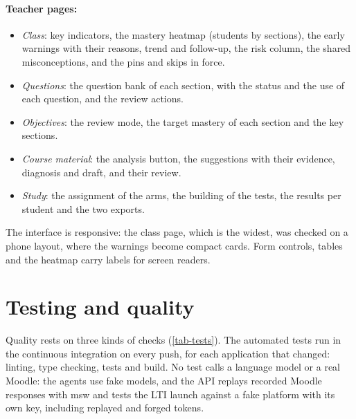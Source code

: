 \paragraph{Teacher pages:}
\begin{itemize}
  \item \emph{Class}: key indicators, the mastery heatmap (students by
        sections), the early warnings with their reasons, trend and
        follow-up, the risk column, the shared misconceptions, and the
        pins and skips in force.
  \item \emph{Questions}: the question bank of each section, with the
        status and the use of each question, and the review actions.
  \item \emph{Objectives}: the review mode, the target mastery of each
        section and the key sections.
  \item \emph{Course material}: the analysis button, the suggestions with
        their evidence, diagnosis and draft, and their review.
  \item \emph{Study}: the assignment of the arms, the building of the
        tests, the results per student and the two exports.
\end{itemize}


The interface is responsive: the class page, which is the widest, was
checked on a phone layout, where the warnings become compact cards. Form
controls, tables and the heatmap carry labels for screen readers.

\section{Testing and quality}
\label{sec-d-tests}

Quality rests on three kinds of checks (\cref{tab-tests}). The automated
tests run in the continuous integration on every push, for each
application that changed: linting, type checking, tests and build. No
test calls a language model or a real Moodle: the agents use fake
models, and the API replays recorded Moodle responses with msw and tests
the LTI launch against a fake platform with its own key, including
replayed and forged tokens.

